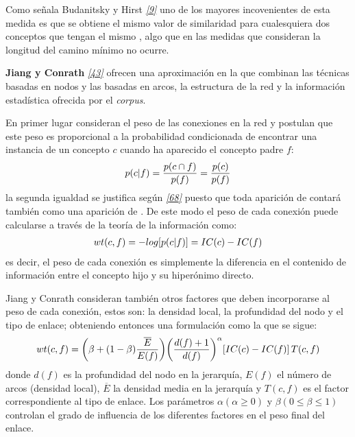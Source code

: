 \documentclass[a4paper,12pt,spanish]{book}
\begin{document}
Como señala Budanitsky y Hirst \label{1.state-of-the-art/ii.medidas-distancia:id45}{\hyperref[zreferences:budanitsky1998]{\emph{{[}9{]}}}} uno de los mayores incovenientes de esta
medida es que se obtiene el mismo valor de similaridad para cualesquiera dos conceptos que
tengan el mismo , algo que en las medidas que consideran la longitud del camino mínimo
no ocurre.

\textbf{Jiang y Conrath} \label{1.state-of-the-art/ii.medidas-distancia:id46}{\hyperref[zreferences:jiang1997]{\emph{{[}43{]}}}} ofrecen una aproximación en la que combinan las técnicas
basadas en nodos y las basadas en arcos, la estructura de la red y la información estadística
ofrecida por el \emph{corpus}.

En primer lugar consideran el peso de las conexiones en la red y postulan que este peso es
proporcional a la probabilidad condicionada de encontrar una instancia de un concepto \(c\)
cuando ha aparecido el concepto padre \(f\):
\begin{gather}
\begin{split}p(c|f) = \frac{p(c \cap f)}{p(f)} = \frac{p(c)}{p(f)}\end{split}\notag
\end{gather}
la segunda igualdad se justifica según \label{1.state-of-the-art/ii.medidas-distancia:id47}{\hyperref[zreferences:resnik1999]{\emph{{[}68{]}}}} puesto que toda aparición de 
contará también como una aparición de . De este modo el peso de cada conexión puede
calcularse a través de la teoría de la información como:
\begin{gather}
\begin{split}wt(c, f) = -log [p(c|f)] = IC(c) - IC(f)\end{split}\notag
\end{gather}
es decir, el peso de cada conexión es simplemente la diferencia en el contenido de información
entre el concepto hijo y su hiperónimo directo.

Jiang y Conrath consideran también otros factores que deben incorporarse al peso de cada
conexión, estos son: la densidad local, la profundidad del nodo y el tipo de enlace; obteniendo
entonces una formulación como la que se sigue:
\begin{gather}
\begin{split}wt(c, f) = \bigg(\beta + (1-\beta)\frac{\overline{E}}{E(f)}\bigg) \bigg(\frac{d(f) + 1}{d(f)}\bigg)^{\alpha} [IC(c) - IC(f)] \, T(c, f)\end{split}\notag
\end{gather}
donde \(d(f)\) es la profundidad del nodo  en la jerarquía, \(E(f)\) el número
de arcos (densidad local), \(\overline{E}\) la densidad media en la jerarquía y \(T(c,f)\)
es el factor correspondiente al tipo de enlace. Los parámetros \(\alpha (\alpha \geq 0)\)
y \(\beta (0 \leq \beta \leq 1)\) controlan el grado de influencia de los diferentes factores
en el peso final del enlace.
\end{document}
